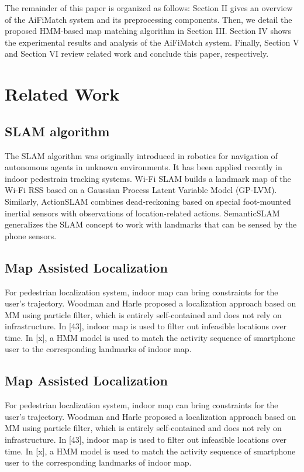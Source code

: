 \documentclass[conference]{IEEEtran}
\begin{document}
The remainder of this paper is organized as follows: Section II gives an overview of the AiFiMatch system and its preprocessing components. Then, we detail the proposed HMM-based map matching algorithm in Section III. Section IV shows the experimental results and analysis of the AiFiMatch system. Finally, Section V and Section VI review related work and conclude this paper, respectively.

\section{Related Work}

\subsection{SLAM algorithm}
The SLAM algorithm was originally introduced in robotics for navigation of autonomous agents in unknown environments. It has been applied recently in indoor pedestrain tracking systems. Wi-Fi SLAM builds a landmark map of the Wi-Fi RSS based on a Gaussian Process Latent Variable Model (GP-LVM). Similarly, ActionSLAM combines dead-reckoning based on special foot-mounted inertial sensors with observations of location-related actions. SemanticSLAM generalizes the SLAM concept to work with landmarks that can be sensed by the phone sensors.

\subsection{Map Assisted Localization}
For pedestrian localization system, indoor map can bring constraints for the user's trajectory. Woodman and Harle proposed a localization approach based on MM using particle filter, which is entirely self-contained and does not rely on infrastructure. In [43], indoor map is used to filter out infeasible locations over time. In [x], a HMM model is used to match the activity sequence of smartphone user to the corresponding landmarks of indoor map. 

\subsection{Map Assisted Localization}
For pedestrian localization system, indoor map can bring constraints for the user's trajectory. Woodman and Harle proposed a localization approach based on MM using particle filter, which is entirely self-contained and does not rely on infrastructure. In [43], indoor map is used to filter out infeasible locations over time. In [x], a HMM model is used to match the activity sequence of smartphone user to the corresponding landmarks of indoor map.
\end{document}
